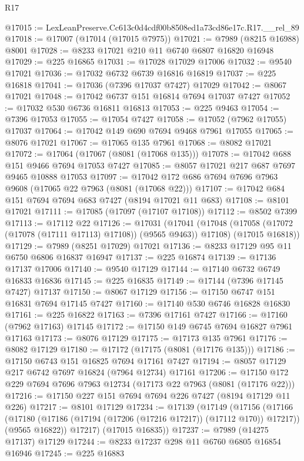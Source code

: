\begin{lexlean}{R17}
\begin{coremodule}
@17015 := LexLeanPreserve.Cc613c0d4cdf00b8508ed1a73cd86e17c.R17.__rel_89
@17018 := @17007 (@17014 (@17015 @7975))
@17021 := @7989 (@8215 @16988) @8001
@17028 := @8233 @17021 @210 @11 @6740 @6807 @16820 @16948
@17029 := @225 @16865
@17031 := @17028 @17029 @17006
@17032 := @9540 @17021
@17036 := @17032 @6732 @6739 @16816 @16819
@17037 := @225 @16818
@17041 := @17036 (@7396 @17037 @7427) @17029
@17042 := @8067 @17021
@17048 := @17042 @6737 @151 @16814 @7694 @17037 @7427
@17052 := @17032 @530 @6736 @16811 @16813
@17053 := @225 @9463
@17054 := @7396 @17053
@17055 := @17054 @7427
@17058 := @17052 (@7962 @17055) @17037
@17064 := @17042 @149 @690 @7694 @9468 @7961 @17055
@17065 := @8076 @17021
@17067 := @17065 @135 @7961
@17068 := @8082 @17021
@17072 := @17064 (@17067 (@8081 (@17068 @135)))
@17078 := @17042 @688 @151 @9466 @7694 @17053 @7427
@17085 := @8057 @17021 @217 @687 @7697 @9465 @10888 @17053
@17097 := @17042 @172 @686 @7694 @7696 @7963 @9608 (@17065 @22 @7963 (@8081 (@17068 @22)))
@17107 := @17042 @684 @151 @7694 @7694 @683 @7427 (@8194 @17021 @11 @683)
@17108 := @8101 @17021
@17111 := @17085 (@17097 (@17107 @17108))
@17112 := @8502 @7399
@17113 := @17112 @22
@17126 := @17031
    (@17041
      (@17048 (@17058 (@17072 (@17078 (@17111 @17113) @17108)) (@9565 @9463)) @17108)
      (@17015 @16818))
@17129 := @7989 (@8251 @17029) @17021
@17136 := @8233 @17129 @95 @11 @6750 @6806 @16837 @16947
@17137 := @225 @16874
@17139 := @17136 @17137 @17006
@17140 := @9540 @17129
@17144 := @17140 @6732 @6749 @16833 @16836
@17145 := @225 @16835
@17149 := @17144 (@7396 @17145 @7427) @17137
@17150 := @8067 @17129
@17156 := @17150 @6747 @151 @16831 @7694 @17145 @7427
@17160 := @17140 @530 @6746 @16828 @16830
@17161 := @225 @16822
@17163 := @7396 @17161 @7427
@17166 := @17160 (@7962 @17163) @17145
@17172 := @17150 @149 @6745 @7694 @16827 @7961 @17163
@17173 := @8076 @17129
@17175 := @17173 @135 @7961
@17176 := @8082 @17129
@17180 := @17172 (@17175 (@8081 (@17176 @135)))
@17186 := @17150 @6743 @151 @16825 @7694 @17161 @7427
@17194 := @8057 @17129 @217 @6742 @7697 @16824 (@7964 @12734) @17161
@17206 := @17150 @172 @229 @7694 @7696 @7963 @12734 (@17173 @22 @7963 (@8081 (@17176 @22)))
@17216 := @17150 @227 @151 @7694 @7694 @226 @7427 (@8194 @17129 @11 @226)
@17217 := @8101 @17129
@17234 := @17139
    (@17149
      (@17156
        (@17166
          (@17180 (@17186 (@17194 (@17206 (@17216 @17217)) (@17112 @170)) @17217))
          (@9565 @16822))
        @17217)
      (@17015 @16835))
@17237 := @7989 (@14275 @17137) @17129
@17244 := @8233 @17237 @298 @11 @6760 @6805 @16854 @16946
@17245 := @225 @16883

\end{coremodule}
\end{lexlean}
